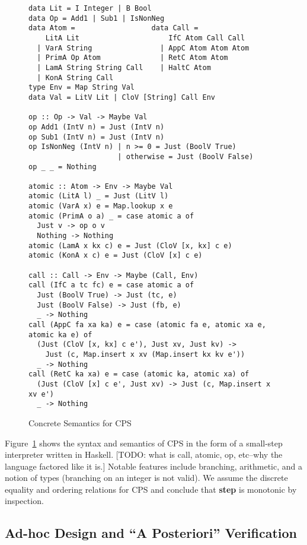 \documentclass{article}
\begin{document}
\begin{figure}
\begin{lstlisting}[basicstyle=\tiny]
data Lit = I Integer | B Bool
data Op = Add1 | Sub1 | IsNonNeg
data Atom =                  data Call =                    
    LitA Lit                     IfC Atom Call Call         
  | VarA String                | AppC Atom Atom Atom        
  | PrimA Op Atom              | RetC Atom Atom                                            
  | LamA String String Call    | HaltC Atom                                                
  | KonA String Call                                                                        
type Env = Map String Val                  
data Val = LitV Lit | CloV [String] Call Env                            

op :: Op -> Val -> Maybe Val
op Add1 (IntV n) = Just (IntV n)
op Sub1 (IntV n) = Just (IntV n)
op IsNonNeg (IntV n) | n >= 0 = Just (BoolV True)
                     | otherwise = Just (BoolV False)
op _ _ = Nothing

atomic :: Atom -> Env -> Maybe Val
atomic (LitA l) _ = Just (LitV l)
atomic (VarA x) e = Map.lookup x e
atomic (PrimA o a) _ = case atomic a of
  Just v -> op o v
  Nothing -> Nothing
atomic (LamA x kx c) e = Just (CloV [x, kx] c e)
atomic (KonA x c) e = Just (CloV [x] c e)

call :: Call -> Env -> Maybe (Call, Env)
call (IfC a tc fc) e = case atomic a of
  Just (BoolV True) -> Just (tc, e)
  Just (BoolV False) -> Just (fb, e)
  _ -> Nothing
call (AppC fa xa ka) e = case (atomic fa e, atomic xa e, atomic ka e) of
  (Just (CloV [x, kx] c e'), Just xv, Just kv) -> 
    Just (c, Map.insert x xv (Map.insert kx kv e'))
  _ -> Nothing
call (RetC ka xa) e = case (atomic ka, atomic xa) of
  (Just (CloV [x] c e', Just xv) -> Just (c, Map.insert x xv e')
  _ -> Nothing
\end{lstlisting}
\caption{Concrete Semantics for CPS}
\label{cps:concrete}
\end{figure}

Figure~\ref{cps:concrete} shows the syntax and semantics of CPS in the form of
a small-step interpreter written in Haskell.
%
[TODO: what is call, atomic, op, etc--why the language factored like it is.]
%
Notable features include branching, arithmetic, and a notion of types
(branching on an integer is not valid).
%
We assume the discrete equality and ordering relations for CPS and conclude
that \textbf{step} is monotonic by inspection.

\subsection{Ad-hoc Design and ``A Posteriori'' Verification }
\end{document}
